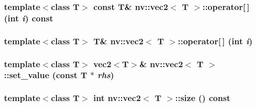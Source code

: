 \hypertarget{classnv_1_1vec2_acea4ef0d81af3e56aec4878ab7a2c54}{
\subsubsection[{operator[]}]{\setlength{\rightskip}{0pt plus 5cm}template$<$class T$>$ const T\& {\bf nv::vec2}$<$ T $>$::operator\mbox{[}$\,$\mbox{]} (int {\em i}) const}}
\label{classnv_1_1vec2_acea4ef0d81af3e56aec4878ab7a2c54}


\hypertarget{classnv_1_1vec2_c2e9b4d7fa0fcd118ff28a17bebf60aa}{
\subsubsection[{operator[]}]{\setlength{\rightskip}{0pt plus 5cm}template$<$class T$>$ T\& {\bf nv::vec2}$<$ T $>$::operator\mbox{[}$\,$\mbox{]} (int {\em i})}}
\label{classnv_1_1vec2_c2e9b4d7fa0fcd118ff28a17bebf60aa}


\hypertarget{classnv_1_1vec2_f344f6a9264866e16bf4b069883e89f9}{
\subsubsection[{set\_\-value}]{\setlength{\rightskip}{0pt plus 5cm}template$<$class T$>$ {\bf vec2}$<$T$>$\& {\bf nv::vec2}$<$ T $>$::set\_\-value (const T $\ast$ {\em rhs})}}
\label{classnv_1_1vec2_f344f6a9264866e16bf4b069883e89f9}


\hypertarget{classnv_1_1vec2_1e82316a32ec1d6c2931dbe913f8b7df}{
\subsubsection[{size}]{\setlength{\rightskip}{0pt plus 5cm}template$<$class T$>$ int {\bf nv::vec2}$<$ T $>$::size () const}}
\label{classnv_1_1vec2_1e82316a32ec1d6c2931dbe913f8b7df}




